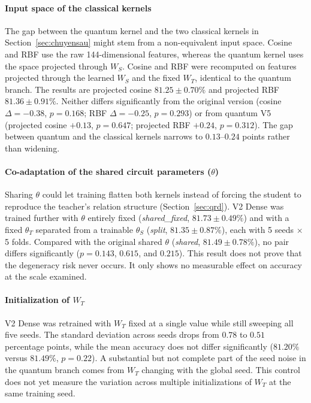 \paragraph{Input space of the classical kernels}

The gap between the quantum kernel and the two classical kernels in
Section~\ref{sec:chuyensau} might stem from a non-equivalent input space. Cosine and
RBF use the raw 144-dimensional features, whereas the quantum kernel
uses the space projected through $W_S$. Cosine and RBF were recomputed on features projected through the learned
$W_S$ and the fixed $W_T$, identical to the quantum branch. The results are
projected cosine $81.25\pm0.70\%$ and projected RBF $81.36\pm0.91\%$. Neither
differs significantly from the original version (cosine
$\Delta=-0.38$, $p=0.168$; RBF $\Delta=-0.25$, $p=0.293$) or from
quantum V5 (projected cosine $+0.13$, $p=0.647$; projected RBF $+0.24$,
$p=0.312$). The gap between quantum and the classical kernels narrows
to $0.13$--$0.24$ points rather than widening.

\paragraph{Co-adaptation of the shared circuit parameters ($\theta$)}

Sharing $\theta$ could let training flatten both kernels instead of
forcing the student to reproduce the teacher's relation structure
(Section~\ref{sec:qrd}). V2 Dense was trained further with $\theta$
entirely fixed (\emph{shared\_fixed}, $81.73\pm0.49\%$) and with a fixed
$\theta_T$ separated from a trainable $\theta_S$ (\emph{split},
$81.35\pm0.87\%$), each with 5 seeds $\times$ 5 folds. Compared with the
original shared $\theta$ (\emph{shared}, $81.49\pm0.78\%$), no pair
differs significantly ($p=0.143$, $0.615$, and $0.215$). This result
does not prove that the degeneracy risk never occurs. It only shows no
measurable effect on accuracy at the scale examined.

\paragraph{Initialization of $W_T$}

V2 Dense was retrained with $W_T$ fixed at a single value while still
sweeping all five seeds. The standard deviation across seeds drops from
$0.78$ to $0.51$ percentage points, while the mean accuracy does not
differ significantly ($81.20\%$ versus $81.49\%$, $p = 0.22$). A
substantial but not complete part of the seed noise in the quantum
branch comes from $W_T$ changing with the global seed. This control does
not yet measure the variation across multiple initializations of $W_T$
at the same training seed.

